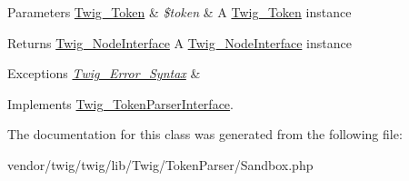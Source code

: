 \begin{DoxyParams}[1]{Parameters}
\hyperlink{classTwig__Token}{Twig\+\_\+\+Token} & {\em \$token} & A \hyperlink{classTwig__Token}{Twig\+\_\+\+Token} instance\\
\hline
\end{DoxyParams}
\begin{DoxyReturn}{Returns}
\hyperlink{interfaceTwig__NodeInterface}{Twig\+\_\+\+Node\+Interface} A \hyperlink{interfaceTwig__NodeInterface}{Twig\+\_\+\+Node\+Interface} instance
\end{DoxyReturn}

\begin{DoxyExceptions}{Exceptions}
{\em \hyperlink{classTwig__Error__Syntax}{Twig\+\_\+\+Error\+\_\+\+Syntax}} & \\
\hline
\end{DoxyExceptions}


Implements \hyperlink{interfaceTwig__TokenParserInterface_a9d003ebcca4a13c6f36b86e79815e823}{Twig\+\_\+\+Token\+Parser\+Interface}.



The documentation for this class was generated from the following file\+:\begin{DoxyCompactItemize}
\item 
vendor/twig/twig/lib/\+Twig/\+Token\+Parser/Sandbox.\+php\end{DoxyCompactItemize}
